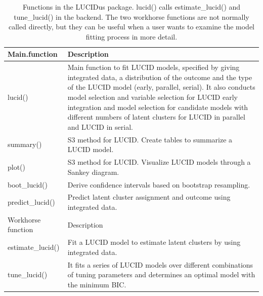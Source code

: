 \label{tbl1}
\begin{table}

\caption{\label{tab:table-1} Functions in the LUCIDus package. lucid() calls estimate_lucid() and tune_lucid() in the backend. The two workhorse functions are not normally called directly, but they can be useful when a user wants to examine the model fitting process in more detail.}
\centering
\begin{tabular}[t]{l|l}
\hline
Main.function & Description\\
\hline
lucid() & Main function to fit LUCID models, specified by giving integrated data, a distribution of the outcome and the type of the LUCID model (early, parallel, serial). It also conducts model selection and variable selection for LUCID early integration and model selection for candidate models with different numbers of latent clusters for LUCID in parallel and LUCID in serial.\\
\hline
summary() & S3 method for LUCID. Create tables to summarize a LUCID model.\\
\hline
plot() & S3 method for LUCID. Visualize LUCID models through a Sankey diagram.\\
\hline
boot\_lucid() & Derive confidence intervals based on bootstrap resampling.\\
\hline
predict\_lucid() & Predict latent cluster assignment and outcome using integrated data.\\
\hline
Workhorse function & Description\\
\hline
estimate\_lucid() & Fit a LUCID model to estimate latent clusters by using integrated data.\\
\hline
tune\_lucid() & It fits a series of LUCID models over different combinations of tuning parameters and determines an optimal model with the minimum BIC.\\
\hline
\end{tabular}
\end{table}

